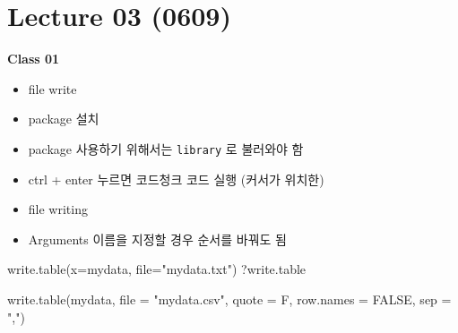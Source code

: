 \documentclass[
]{book}
\newenvironment{Shaded}{\begin{snugshade}}{\end{snugshade}}
\newcommand{\AttributeTok}[1]{\textcolor[rgb]{0.77,0.63,0.00}{#1}}
\newcommand{\ConstantTok}[1]{\textcolor[rgb]{0.00,0.00,0.00}{#1}}
\newcommand{\FunctionTok}[1]{\textcolor[rgb]{0.00,0.00,0.00}{#1}}
\newcommand{\NormalTok}[1]{#1}
\newcommand{\OtherTok}[1]{\textcolor[rgb]{0.56,0.35,0.01}{#1}}
\newcommand{\SpecialCharTok}[1]{\textcolor[rgb]{0.00,0.00,0.00}{#1}}
\newcommand{\StringTok}[1]{\textcolor[rgb]{0.31,0.60,0.02}{#1}}
\providecommand{\tightlist}{%
  \setlength{\itemsep}{0pt}\setlength{\parskip}{0pt}}
\begin{document}
\hypertarget{lecture-03-0609}{%
\section{Lecture 03 (0609)}\label{lecture-03-0609}}

\textbf{Class 01}

\begin{itemize}
\tightlist
\item
  file write
\item
  package 설치
\item
  package 사용하기 위해서는 \texttt{library} 로 불러와야 함
\item
  ctrl + enter 누르면 코드청크 코드 실행 (커서가 위치한)
\end{itemize}

\begin{Shaded}
\end{Shaded}

\begin{itemize}
\tightlist
\item
  file writing
\item
  Arguments 이름을 지정할 경우 순서를 바꿔도 됨
\end{itemize}

\begin{Shaded}
\begin{Highlighting}[]
\FunctionTok{write.table}\NormalTok{(}\AttributeTok{x=}\NormalTok{mydata, }\AttributeTok{file=}\StringTok{"mydata.txt"}\NormalTok{)}
\NormalTok{?write.table}

\FunctionTok{write.table}\NormalTok{(mydata, }
            \AttributeTok{file =} \StringTok{"mydata.csv"}\NormalTok{, }
            \AttributeTok{quote =}\NormalTok{ F, }
            \AttributeTok{row.names =} \ConstantTok{FALSE}\NormalTok{,}
            \AttributeTok{sep =} \StringTok{","}\NormalTok{)}
\end{Highlighting}
\end{Shaded}
\end{document}
